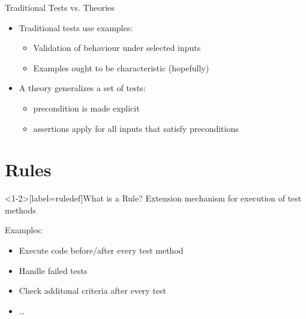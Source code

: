 \begin{frame}{Traditional Tests vs. Theories}
	\begin{itemize}
		\item Traditional tests use examples:
			\begin{itemize}
				\item Validation of behaviour under selected inputs
				\item Examples ought to be characteristic (hopefully)
			\end{itemize}
		\item A theory generalizes a set of tests:
			\begin{itemize}
				\item precondition is made explicit
				\item assertions apply for all inputs that satisfy preconditions
			\end{itemize}
	\end{itemize}
\end{frame}


{
\date{René Magritte, Golconda}
\part{Rules}
}

\begin{frame}<1-2>[label=ruledef]{What is a Rule?}
	Extension mechanism for execution of test methods
	\begin{block}{Examples:}
		\begin{itemize}
			\item<alert@2> Execute code before/after every test method
			\item<alert@3> Handle failed tests
			\item Check additonal criteria after every test
			\item \dots
		\end{itemize}
	\end{block}
\end{frame}

